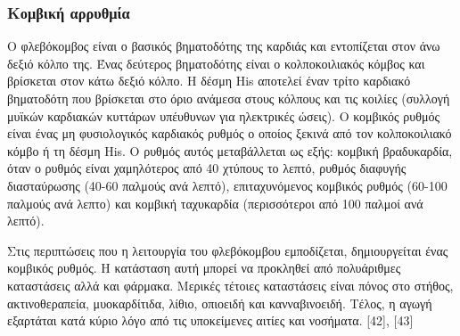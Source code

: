 \subsubsection{Κομβική αρρυθμία} 
Ο φλεβόκομβος είναι ο βασικός βηματοδότης της καρδιάς και εντοπίζεται στον άνω δεξιό κόλπο της. Ένας δεύτερος βηματοδότης είναι ο κολποκοιλιακός κόμβος και βρίσκεται στον κάτω δεξιό κόλπο. Η δέσμη \en His \gr αποτελεί έναν τρίτο καρδιακό βηματοδότη που βρίσκεται στο όριο ανάμεσα στους κόλπους και τις κοιλίες (συλλογή μυϊκών καρδιακών κυττάρων υπέυθυνων για ηλεκτρικές ώσεις). Ο κομβικός ρυθμός είναι ένας μη φυσιολογικός καρδιακός ρυθμός ο οποίος ξεκινά από τον κολποκοιλιακό κόμβο ή τη δέσμη \en His. \gr Ο ρυθμός αυτός μεταβάλλεται ως εξής: κομβική βραδυκαρδία, όταν ο ρυθμός είναι χαμηλότερος από 40 χτύπους το λεπτό, ρυθμός διαφυγής διασταύρωσης (40-60 παλμούς ανά λεπτό), επιταχυνόμενος κομβικός ρυθμός (60-100 παλμούς ανά λεπτο) και κομβική ταχυκαρδία (περισσότεροι από 100 παλμοί ανά λεπτό). 
\par
Στις περιπτώσεις που η λειτουργία του φλεβόκομβου εμποδίζεται, δημιουργείται ένας κομβικός ρυθμός. Η κατάσταση αυτή μπορεί να προκληθεί από πολυάριθμες καταστάσεις αλλά και φάρμακα. Μερικές τέτοιες καταστάσεις είναι πόνος στο στήθος, ακτινοθεραπεία, μυοκαρδίτιδα, λίθιο, οπιοειδή και κανναβινοειδή.  Τέλος, η αγωγή εξαρτάται κατά κύριο λόγο από τις υποκείμενες αιτίες και νοσήματα.  [42], [43]
‌

